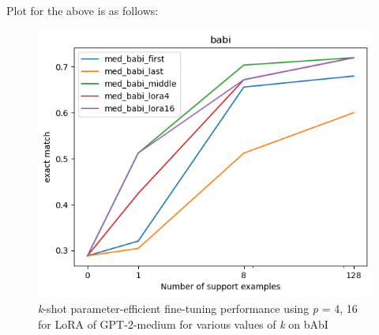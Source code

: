 Plot for the above is as follows:
\begin{figure}[H]
    \centering
    \includegraphics[width=0.75\linewidth]{./figures/q3_babi_plot}
    \caption{\textit{k}-shot parameter-efficient fine-tuning performance using \textit{p} = 4, 16 for LoRA of GPT-2-medium for various values of \textit{k} on bAbI}
\end{figure}
